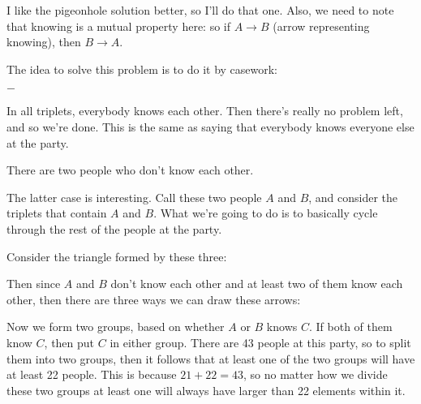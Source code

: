 \documentclass[10pt]{article}
\begin{document}
\begin{solution}    
    I like the pigeonhole solution better, so I'll do that one. Also, we need to note that knowing is a mutual property here: so if $A \rightarrow B$ (arrow representing knowing), then $B \rightarrow A$.
    
    The idea to solve this problem is to do it by casework: 

    \begin{list}{$-$}{}
        \item In all triplets, everybody knows each other. Then there's really no problem left, and so we're done. This is the same as saying that everybody knows everyone else at the party.
        \item There are two people who don't know each other.
    \end{list}

    The latter case is interesting. Call these two people $A$ and $B$, and consider the triplets that contain $A$ and $B$. What we're going to do is to basically cycle through the rest of the people at the party. 

    Consider the triangle formed by these three:

    \begin{center}
    \end{center}

    Then since $A$ and $B$ don't know each other and at least two of them know each other, then there are three ways we can draw these arrows: 

    \begin{center}
    \end{center}

    Now we form two groups, based on whether $A$ or $B$ knows $C$. If both of them know $C$, then put $C$ in either group. There are 43 people at this party, so to split them into two groups, then it follows that at least one of the two groups will have at least 22 people. This is because $21 + 22 = 43$, so no matter how we divide these two groups at least one will always have larger than 22 elements within it.
\end{solution}
\end{document}
